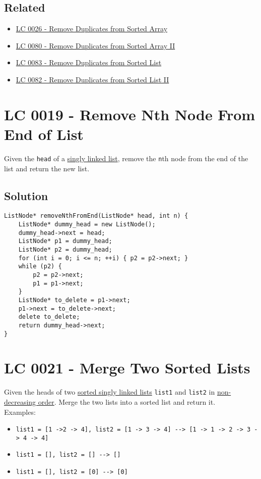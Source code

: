 \subsection*{Related}
\begin{itemize}
	\item \hyperref[lc0026]{LC 0026 - Remove Duplicates from Sorted Array}
	\item \hyperref[lc0080]{LC 0080 - Remove Duplicates from Sorted Array II}
	\item \hyperref[lc0083]{LC 0083 - Remove Duplicates from Sorted List}
	\item \hyperref[lc0082]{LC 0082 - Remove Duplicates from Sorted List II}
\end{itemize}

\section{LC 0019 - Remove Nth Node From End of List}\label{lc0019}
Given the {\colorbox{CodeBackground}{\lstinline|head|}} of a \ul{singly linked list}, remove the {\colorbox{CodeBackground}{\lstinline|n|}}th node from the end of the list and return the new list.

\subsection*{Solution}
\begin{lstlisting}
ListNode* removeNthFromEnd(ListNode* head, int n) {
	ListNode* dummy_head = new ListNode();
	dummy_head->next = head;
	ListNode* p1 = dummy_head;
	ListNode* p2 = dummy_head;
	for (int i = 0; i <= n; ++i) { p2 = p2->next; }
	while (p2) {
		p2 = p2->next;
		p1 = p1->next;
	}
	ListNode* to_delete = p1->next;
	p1->next = to_delete->next;
	delete to_delete;
	return dummy_head->next;
}
\end{lstlisting}

\section{LC 0021 - Merge Two Sorted Lists}\label{lc0021}
Given the heads of two \ul{sorted singly linked lists} {\colorbox{CodeBackground}{\lstinline|list1|}} and {\colorbox{CodeBackground}{\lstinline|list2|}} in \ul{non-decreasing order}. Merge the two lists into a sorted list and return it.\\

Examples:
\begin{itemize}
	\item {\colorbox{CodeBackground}{\lstinline|list1 = [1 ->2 -> 4], list2 = [1 -> 3 -> 4] --> [1 -> 1 -> 2 -> 3 -> 4 -> 4]|}}
	\item {\colorbox{CodeBackground}{\lstinline|list1 = [], list2 = [] --> []|}}
	\item {\colorbox{CodeBackground}{\lstinline|list1 = [], list2 = [0] --> [0]|}}
\end{itemize}

